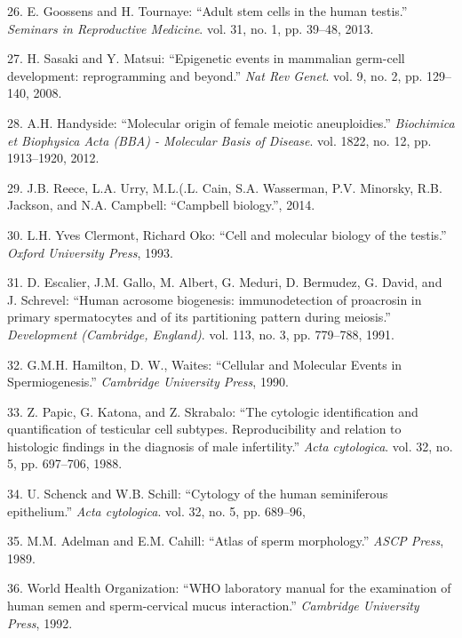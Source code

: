 \documentclass[12pt,a4paper,twoside]{ugathesis}
\theoremstyle{definition}
\theoremstyle{definition}
\theoremstyle{definition}
\theoremstyle{remark}
\begin{document}
\hypertarget{ref-Goossens2013}{}
26. E. Goossens and H. Tournaye: ``Adult stem cells in the human
testis.'' \emph{Seminars in Reproductive Medicine}. vol. 31, no. 1, pp.
39--48, 2013.

\hypertarget{ref-Sasaki2008}{}
27. H. Sasaki and Y. Matsui: ``Epigenetic events in mammalian germ-cell
development: reprogramming and beyond.'' \emph{Nat Rev Genet}. vol. 9,
no. 2, pp. 129--140, 2008.

\hypertarget{ref-Handyside2012}{}
28. A.H. Handyside: ``Molecular origin of female meiotic aneuploidies.''
\emph{Biochimica et Biophysica Acta (BBA) - Molecular Basis of Disease}.
vol. 1822, no. 12, pp. 1913--1920, 2012.

\hypertarget{ref-Reece2014}{}
29. J.B. Reece, L.A. Urry, M.L.(.L. Cain, S.A. Wasserman, P.V. Minorsky,
R.B. Jackson, and N.A. Campbell: ``Campbell biology.'', 2014.

\hypertarget{ref-YvesClermontRichardOko1993}{}
30. L.H. Yves Clermont, Richard Oko: ``Cell and molecular biology of the
testis.'' \emph{Oxford University Press}, 1993.

\hypertarget{ref-Escalier1991}{}
31. D. Escalier, J.M. Gallo, M. Albert, G. Meduri, D. Bermudez, G.
David, and J. Schrevel: ``Human acrosome biogenesis: immunodetection of
proacrosin in primary spermatocytes and of its partitioning pattern
during meiosis.'' \emph{Development (Cambridge, England)}. vol. 113, no.
3, pp. 779--788, 1991.

\hypertarget{ref-Hamilton1987}{}
32. G.M.H. Hamilton, D. W., Waites: ``Cellular and Molecular Events in
Spermiogenesis.'' \emph{Cambridge University Press}, 1990.

\hypertarget{ref-Papic}{}
33. Z. Papic, G. Katona, and Z. Skrabalo: ``The cytologic identification
and quantification of testicular cell subtypes. Reproducibility and
relation to histologic findings in the diagnosis of male infertility.''
\emph{Acta cytologica}. vol. 32, no. 5, pp. 697--706, 1988.

\hypertarget{ref-Schenck}{}
34. U. Schenck and W.B. Schill: ``Cytology of the human seminiferous
epithelium.'' \emph{Acta cytologica}. vol. 32, no. 5, pp. 689--96,

\hypertarget{ref-Adelman1989}{}
35. M.M. Adelman and E.M. Cahill: ``Atlas of sperm morphology.''
\emph{ASCP Press}, 1989.

\hypertarget{ref-WorldHealthOrganization1992}{}
36. World Health Organization: ``WHO laboratory manual for the
examination of human semen and sperm-cervical mucus interaction.''
\emph{Cambridge University Press}, 1992.
\end{document}
